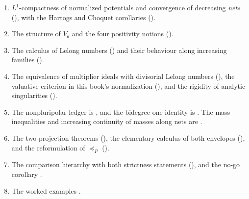 \begin{enumerate}
\item\label{itm:ch51-exp:compactness}
      \(L^1\)-compactness of normalized potentials and convergence of
      decreasing \emph{nets}
      (), with the Hartogs and Choquet
      corollaries ().
\item\label{itm:ch51-exp:minimal}
      The structure of \(V_\theta\) and the four positivity notions
      ().
\item\label{itm:ch51-exp:lelong}
      The calculus of Lelong numbers
      ()
      and their behaviour along increasing families
      ().
\item\label{itm:ch51-exp:ideals}
      The equivalence of multiplier ideals with divisorial Lelong numbers
      (), the valuative criterion in
      this book's normalization
      (), and the rigidity of
      analytic singularities ().
\item\label{itm:ch51-exp:npp}
      The nonpluripolar ledger is , and the
      bidegree-one identity is .  The mass
      inequalities and increasing continuity of masses along nets are
      .
\item\label{itm:ch51-exp:envelopes}
      The two projection theorems
      (), the
      elementary calculus of both envelopes
      (), and the
      reformulation of \(\preceq_P\)
      ().
\item\label{itm:ch51-exp:hierarchy}
      The comparison hierarchy with both strictness statements
      (), and the no-go corollary
      .
\item\label{itm:ch51-exp:examples}
      The worked examples
      .
\end{enumerate}

